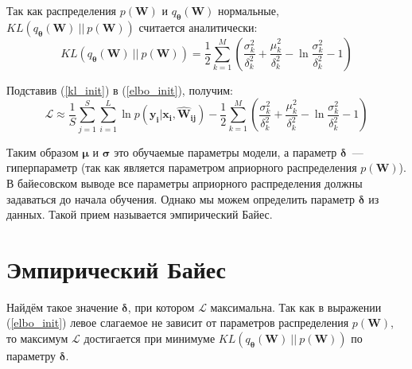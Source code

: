 \documentclass{article}
\numberwithin{equation}{section}
\begin{document}
    Так как распределения $p(\pmb{W})$ и $q_{\pmb{\theta}}(\pmb{W})$ нормальные,
    $KL(q_{\pmb{\theta}}(\pmb{W})~||~p(\pmb{W}))$ считается аналитически:
    \begin{equation}\label{kl_init}
        KL(
            q_{\pmb{\theta}}(\pmb{W})~||~p(\pmb{W})
        )
        =
            \frac{1}{2}\sum_{k=1}^{M}(
                \frac
                    {\sigma_{k}^2}
                    {\delta_{k}^2}
                +
                \frac
                    {\mu_{k}^2}
                    {\delta_{k}^2}
                -
                \ln{
                    \frac
                        {\sigma_{k}^2}
                        {\delta_{k}^2}
                }
                - 1
            )
    \end{equation}

    Подставив (\ref{kl_init}) в (\ref{elbo_init}), получим:
    \begin{equation}\label{elbo_kl}
        \mathcal{L}
        \approx
            \frac{1}{S} \sum_{j=1}^S \sum_{i=1}^{L} {
                \ln{
                    p(\pmb{y_{i}} | \pmb{x_{i}}, \pmb{\hat{W}_{ij}})
                }
            }
        -
            \frac{1}{2}\sum_{k=1}^{M}(
            \frac
                {\sigma_{k}^2}
                {\delta_{k}^2}
            +
            \frac
                {\mu_{k}^2}
                {\delta_{k}^2}
            -
            \ln{
                \frac
                    {\sigma_{k}^2}
                    {\delta_{k}^2}
            }
            - 1
        )
    \end{equation}

    Таким образом $\pmb{\mu}$ и $\pmb{\sigma}$ это обучаемые параметры модели,
    а параметр $\pmb{\delta}$~--- гиперпараметр
    (так как является параметром априорного распределения $p(\pmb{W})$).
    В байесовском выводе все параметры априорного распределения
    должны задаваться до начала обучения.
    Однако мы можем определить параметр $\pmb{\delta}$ из данных.
    Такой прием называется эмпирический Байес.

    \section{Эмпирический Байес}
    Найдём такое значение $\pmb{\delta}$, при котором $\mathcal{L}$ максимальна.
    Так как в выражении (\ref{elbo_init})
    левое слагаемое не зависит от параметров распределения
    $p(\pmb{W})$, то максимум $\mathcal{L}$ достигается при минимуме
    $KL(q_{\pmb{\theta}}(\pmb{W})~||~p(\pmb{W}))$ по параметру $\pmb{\delta}$.
\end{document}
